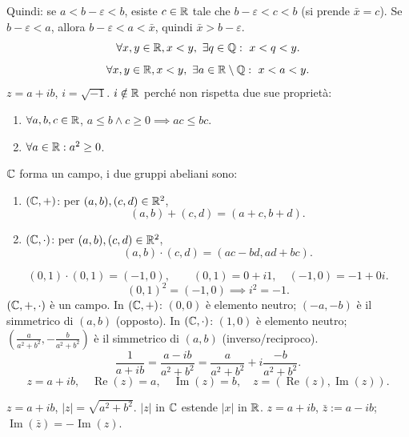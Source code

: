 Quindi: se $a<b-\varepsilon<b$, esiste $c\in\mathbb R$ tale che $b-\varepsilon<c<b$ (si prende $\bar x=c$).
Se $b-\varepsilon<a$, allora $b-\varepsilon<a<\bar x$, quindi $\bar x>b-\varepsilon$.
\[\forall x,y\in\R, x<y,\ \exists q\in\Q:\ x<q<y.\]
\[\forall x,y\in\mathbb R, x<y,\ \exists a\in\mathbb R\setminus\mathbb Q:\ x<a<y.\]
$z=a+ib$, $i=\sqrt{-1}$.
$i\notin\mathbb R$ perché non rispetta due sue proprietà:
\begin{enumerate}\item $\forall a,b,c\in\mathbb R$, $a\le b\land c\ge0\implies ac\le bc$.
\item $\forall a\in\mathbb R:a^2\ge0$.
\end{enumerate}
$\mathbb C$ forma un campo, i due gruppi abeliani sono:
\begin{enumerate}\item $(\mathbb C,+)$: per $(a,b),(c,d)\in\mathbb R^2$,
\[(a,b)+(c,d)=(a+c,b+d).\]
\item $(\mathbb C,\cdot)$: per $(a,b),(c,d)\in\mathbb R^2$,
\[(a,b)\cdot(c,d)=(ac-bd,ad+bc).\]
\end{enumerate}
\[(0,1)\cdot(0,1)=(-1,0),\qquad (0,1)=0+i1,\quad(-1,0)=-1+0i.\]
\[(0,1)^2=(-1,0)\implies i^2=-1.\]
$(\mathbb C,+,\cdot)$ è un campo.
In $(\mathbb C,+)$: $(0,0)$ è elemento neutro; $(-a,-b)$ è il simmetrico di $(a,b)$ (opposto).
In $(\mathbb C,\cdot)$: $(1,0)$ è elemento neutro;
$\left(\frac{a}{a^2+b^2},-\frac{b}{a^2+b^2}\right)$ è il simmetrico di $(a,b)$ (inverso/reciproco).
\[\frac1{a+ib}=\frac{a-ib}{a^2+b^2}=\frac a{a^2+b^2}+i\frac{-b}{a^2+b^2}.\]
\[z=a+ib,\quad\operatorname{Re}(z)=a,\quad\operatorname{Im}(z)=b,\quad z=(\operatorname{Re}(z),\operatorname{Im}(z)).\]
\begin{center}\end{center}
$z=a+ib$, $|z|=\sqrt{a^2+b^2}$.
$|z|$ in $\mathbb C$ estende $|x|$ in $\mathbb R$.
$z=a+ib$, $\bar z:=a-ib$; $\operatorname{Im}(\bar z)=-\operatorname{Im}(z)$.

